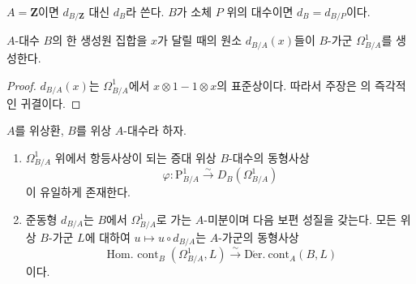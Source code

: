 $A=\mathbf Z$이면 $d_{B/\mathbf Z}$ 대신 $d_B$라 쓴다. $B$가 소체
$P$ 위의 대수이면 $d_B=d_{B/P}$이다.

\begin{proposition}[20.4.7]
\label{0.20.4.7-ko}
$A$-대수 $B$의 한 생성원 집합을 $x$가 달릴 때의 원소
$d_{B/A}(x)$들이 $B$-가군 $\Omega^1_{B/A}$를 생성한다.
\end{proposition}

\begin{proof}
$d_{B/A}(x)$는 $\Omega^1_{B/A}$에서
$x\otimes1-1\otimes x$의 표준상이다. 따라서 주장은
의 즉각적인 귀결이다.
\end{proof}

\begin{theorem}[20.4.8]
\label{0.20.4.8-ko}
$A$를 위상환, $B$를 위상 $A$-대수라 하자.
\begin{enumerate}
  \item[\rm(i)] $\Omega^1_{B/A}$ 위에서 항등사상이 되는 증대 위상
  $B$-대수의 동형사상
\begin{equation}
\tag{20.4.8.1}
\label{0.20.4.8.1-ko}
  \varphi:\mathrm P^1_{B/A}\xrightarrow{\sim}
  D_B(\Omega^1_{B/A})
\end{equation}
  이 유일하게 존재한다.
  \item[\rm(ii)] 준동형 $d_{B/A}$는 $B$에서
  $\Omega^1_{B/A}$로 가는 $A$-미분이며 다음 보편 성질을 갖는다.
  모든 위상 $B$-가군 $L$에 대하여 $u\mapsto u\circ d_{B/A}$는
  $A$-가군의 동형사상
\begin{equation}
\tag{20.4.8.2}
\label{0.20.4.8.2-ko}
  \operatorname{Hom.\ cont}_B(\Omega^1_{B/A},L)
  \xrightarrow{\sim}
  \operatorname{D\acute{e}r.\ cont}_A(B,L)
\end{equation}
  이다.
\end{enumerate}
\end{theorem}

